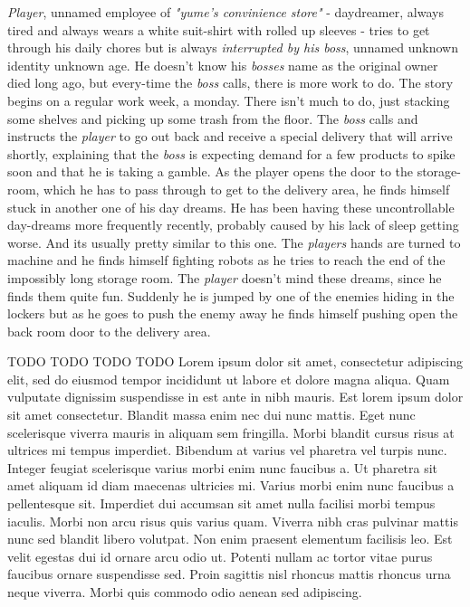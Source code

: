 \documentclass[10pt,a4paper]{article}
\begin{document}
\emph{Player}, unnamed employee of \emph{"yume's convinience store"} - daydreamer, always tired and always wears a white suit-shirt with rolled up sleeves - tries to get through his daily chores but is always \emph{interrupted by his \emph{boss}}, unnamed unknown identity unknown age. He doesn't know his \emph{bosses} name as the original owner died long ago, but every-time the \emph{boss} calls, there is more work to do. The story begins on a regular work week, a monday. There isn't much to do, just stacking some shelves and picking up some trash from the floor. The \emph{boss} calls and instructs the \emph{player} to go out back and receive a special delivery that will arrive shortly, explaining that the \emph{boss} is expecting demand for a few products to spike soon and that he is taking a gamble. As the player opens the door to the storage-room, which he has to pass through to get to the delivery area, he finds himself stuck in another one of his day dreams. He has been having these uncontrollable day-dreams more frequently recently, probably caused by his lack of sleep getting worse. And its usually pretty similar to this one. The \emph{players} hands are turned to machine and he finds himself fighting robots as he tries to reach the end of the impossibly long storage room. The \emph{player} doesn't mind these dreams, since he finds them quite fun. Suddenly he is jumped by one of the enemies hiding in the lockers but as he goes to push the enemy away he finds himself pushing open the back room door to the delivery area.


TODO TODO TODO TODO
Lorem ipsum dolor sit amet, consectetur adipiscing elit, sed do eiusmod tempor incididunt ut labore et dolore magna aliqua. Quam vulputate dignissim suspendisse in est ante in nibh mauris. Est lorem ipsum dolor sit amet consectetur. Blandit massa enim nec dui nunc mattis. Eget nunc scelerisque viverra mauris in aliquam sem fringilla. Morbi blandit cursus risus at ultrices mi tempus imperdiet. Bibendum at varius vel pharetra vel turpis nunc. Integer feugiat scelerisque varius morbi enim nunc faucibus a. Ut pharetra sit amet aliquam id diam maecenas ultricies mi. Varius morbi enim nunc faucibus a pellentesque sit. Imperdiet dui accumsan sit amet nulla facilisi morbi tempus iaculis. Morbi non arcu risus quis varius quam. Viverra nibh cras pulvinar mattis nunc sed blandit libero volutpat. Non enim praesent elementum facilisis leo. Est velit egestas dui id ornare arcu odio ut. Potenti nullam ac tortor vitae purus faucibus ornare suspendisse sed. Proin sagittis nisl rhoncus mattis rhoncus urna neque viverra. Morbi quis commodo odio aenean sed adipiscing.
\end{document}
